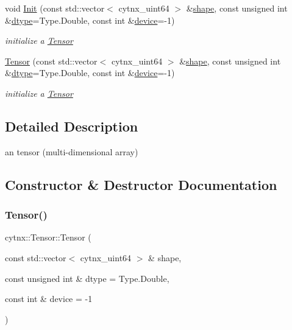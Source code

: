 \begin{DoxyCompactItemize}
\item 
void \hyperlink{classcytnx_1_1Tensor_afdb4470e0dc934964d80aa9c761cca48}{Init} (const std\+::vector$<$ cytnx\+\_\+uint64 $>$ \&\hyperlink{classcytnx_1_1Tensor_a6d0ab6d09633ad4d6099aa822ec5335a}{shape}, const unsigned int \&\hyperlink{classcytnx_1_1Tensor_a4472af6f8e825a13440e832bf82fb627}{dtype}=Type.\+Double, const int \&\hyperlink{classcytnx_1_1Tensor_ac6d3310eb4defbdacf662dcd81d8fe09}{device}=-\/1)
\begin{DoxyCompactList}\small\item\em initialize a \hyperlink{classcytnx_1_1Tensor}{Tensor} \end{DoxyCompactList}\item 
\hyperlink{classcytnx_1_1Tensor_afdcff16b2096d10b524161be52ba767e}{Tensor} (const std\+::vector$<$ cytnx\+\_\+uint64 $>$ \&\hyperlink{classcytnx_1_1Tensor_a6d0ab6d09633ad4d6099aa822ec5335a}{shape}, const unsigned int \&\hyperlink{classcytnx_1_1Tensor_a4472af6f8e825a13440e832bf82fb627}{dtype}=Type.\+Double, const int \&\hyperlink{classcytnx_1_1Tensor_ac6d3310eb4defbdacf662dcd81d8fe09}{device}=-\/1)
\begin{DoxyCompactList}\small\item\em initialize a \hyperlink{classcytnx_1_1Tensor}{Tensor} \end{DoxyCompactList}\end{DoxyCompactItemize}



\subsection{Detailed Description}
an tensor (multi-\/dimensional array) 

\subsection{Constructor \& Destructor Documentation}
\mbox{\label{classcytnx_1_1Tensor_afdcff16b2096d10b524161be52ba767e}} 
\subsubsection{\texorpdfstring{Tensor()}{Tensor()}}
{\footnotesize\ttfamily cytnx\+::\+Tensor\+::\+Tensor (\begin{DoxyParamCaption}\item[{const std\+::vector$<$ cytnx\+\_\+uint64 $>$ \&}]{shape,  }\item[{const unsigned int \&}]{dtype = {\ttfamily Type.Double},  }\item[{const int \&}]{device = {\ttfamily -\/1} }\end{DoxyParamCaption})\hspace{0.3cm}{\ttfamily [inline]}}



